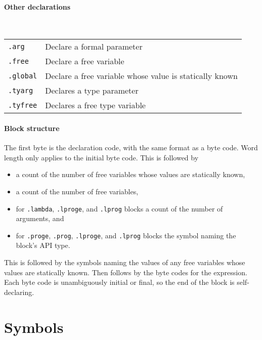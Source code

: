 \documentclass{article}
\begin{document}
\paragraph{Other declarations}\

\begin{tabular}{l@{ --- }l}
  \texttt{.arg} & Declare a formal parameter \\
  \texttt{.free} & Declare a free variable \\
  \texttt{.global} & Declare a free variable whose value is statically known \\
  \texttt{.tyarg} & Declares a type parameter \\
  \texttt{.tyfree} & Declares a free type variable \\
\end{tabular}

\paragraph{Block structure}

The first byte is the declaration code, with the same format as a byte code.
Word length only applies to the initial byte code.
This is followed by
\begin{itemize}
\item a count of the number of free variables whose values are statically known,
\item a count of the number of free variables,
\item for \texttt{.lambda}, \texttt{.lproge}, and \texttt{.lprog} blocks a count of the number of arguments, and
\item for \texttt{.proge}, \texttt{.prog}, \texttt{.lproge}, and \texttt{.lprog} blocks the symbol naming the block's API type.
\end{itemize}
This is followed by the symbols naming the values of any free variables whose values are statically known.
Then follows by the byte codes for the expression.
Each byte code is unambiguously initial or final, so the end of the block is self-declaring.

\section{Symbols}
\end{document}
